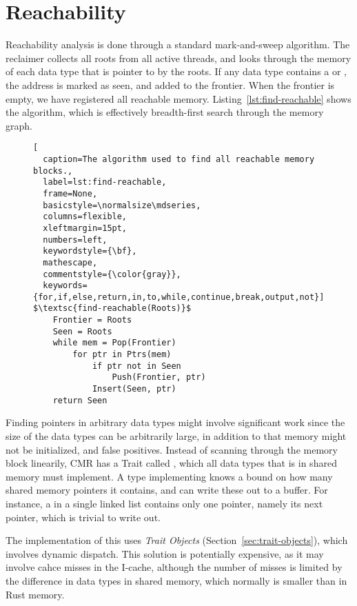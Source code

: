 \section{Reachability\label{sec:reachability}}

Reachability analysis is done through a standard mark-and-sweep algorithm. The reclaimer collects
all roots from all active threads, and looks through the memory of each data type that is pointer
to by the roots. If any data type contains a  or , the address is marked as seen,
and added to the frontier. When the frontier is empty, we have registered all reachable memory.
Listing~\ref{lst:find-reachable} shows the algorithm, which is effectively breadth-first search
through the memory graph.

\begin{figure}[ht]
\begin{lstlisting}[
  caption=The algorithm used to find all reachable memory blocks.,
  label=lst:find-reachable,
  frame=None,
  basicstyle=\normalsize\mdseries,
  columns=flexible,
  xleftmargin=15pt,
  numbers=left,
  keywordstyle={\bf},
  mathescape,
  commentstyle={\color{gray}},
  keywords={for,if,else,return,in,to,while,continue,break,output,not}]
$\textsc{find-reachable(Roots)}$
    Frontier = Roots
    Seen = Roots
    while mem = Pop(Frontier)
        for ptr in Ptrs(mem)
            if ptr not in Seen
                Push(Frontier, ptr)
            Insert(Seen, ptr)
    return Seen
\end{lstlisting}
\end{figure}

Finding pointers in arbitrary data types might involve significant work since the size of the data
types can be arbitrarily large, in addition to that memory might not be initialized, and false
positives. Instead of scanning through the memory block linearily,  CMR has a Trait called , which all
data types that is in shared memory must implement.  A type implementing  knows a bound
on how many shared memory pointers it contains, and can write these out to a buffer. For instance,
a  in a single linked list contains only one pointer, namely its next pointer, which is
trivial to write out.

The implementation of this uses \emph{Trait Objects} (Section~\ref{sec:trait-objects}), which involves
dynamic dispatch. This solution is potentially expensive, as it may involve cahce misses in the
I-cache, although the number of misses is limited by the difference in data types in shared memory,
which normally is smaller than in Rust memory.

